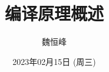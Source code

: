 \documentclass[]{beamer}
\title[编译原理概述]{编译原理概述}
\author[魏恒峰]{\large 魏恒峰}
\institute{hfwei@nju.edu.cn}
\date{2023年02月15日 (周三)}
\begin{document}
\maketitle



\thankyou{}

\end{document}

